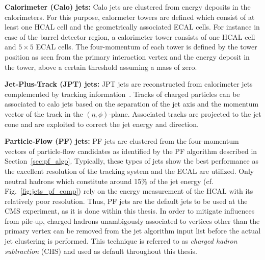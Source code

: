 \begin{description}
 \item \textbf{Calorimeter (Calo) jets:} Calo jets are clustered from energy deposits in the calorimeters. For this purpose, calormeter towers are defined which consist of at least one HCAL cell and the geometrically associated ECAL cells. For instance in case of the barrel detector region, a calorimeter tower consists of one HCAL cell and $\mathrm{5 \times 5}$ ECAL cells. The four-momentum of each tower is defined by the tower position as seen from the primary interaction vertex and the energy deposit in the tower, above a certain threshold assuming a mass of zero. 
 \item \textbf{Jet-Plus-Track (JPT) jets:} JPT jets are reconstructed from calorimeter jets complemented by tracking information~\cite{CMS-PAS-JME-09-002}. Tracks of charged particles can be associated to calo jets based on the separation of the jet axis and the momentum vector of the track in the $(\eta,\phi)$-plane. Associated tracks are projected to the jet cone and are exploited to correct the jet energy and direction. 
 \item \textbf{Particle-Flow (PF) jets:} PF jets are clustered from the four-momentum vectors of particle-flow candidates as identified by the PF algorithm described in Section~\ref{sec:pf_algo}. Typically, these types of jets show the best performance as the excellent resolution of the tracking system and the ECAL are utilized. Only neutral hadrons which constitute around 15\% of the jet energy (cf. Fig.~\ref{fig:jets_pf_comp}) rely on the energy measurement of the HCAL with its relatively poor resolution. Thus, PF jets are the default jets to be used at the CMS experiment, as it is done within this thesis. In order to mitigate influences from pile-up, charged hadrons unambigously associated to vertices other than the primary vertex can be removed from the jet algorithm input list before the actual jet clustering is performed. This technique is referred to as \textit{charged hadron subtraction} (CHS) and used as default throughout this thesis. 
\end{description}

